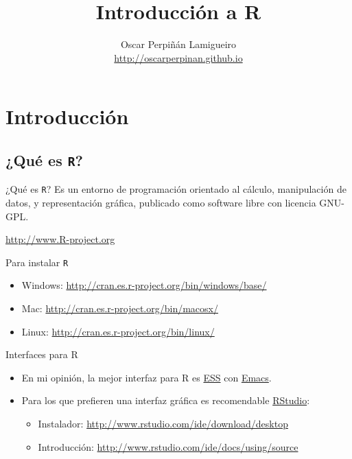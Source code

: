 \documentclass[xcolor={usenames,svgnames,dvipsnames}]{beamer}
\author{Oscar Perpiñán Lamigueiro \\ \url{http://oscarperpinan.github.io}}
\date{}
\title{Introducción a R}
\begin{document}
\maketitle

\section{Introducción}
\label{sec-1}
\subsection{¿Qué es \texttt{R}?}
\label{sec-1-1}
\begin{frame}[fragile,label=sec-1-1-1]{¿Qué es \texttt{R}?}
 Es un entorno de programación orientado al cálculo, manipulación de datos, y representación gráfica, publicado como software libre con licencia GNU-GPL.
\begin{center}
\url{http://www.R-project.org} 
\end{center}
\end{frame}

\begin{frame}[fragile,label=sec-1-1-2]{Para instalar \texttt{R}}
 \begin{itemize}
\item Windows: \url{http://cran.es.r-project.org/bin/windows/base/}
\item Mac: \url{http://cran.es.r-project.org/bin/macosx/}
\item Linux: \url{http://cran.es.r-project.org/bin/linux/}
\end{itemize}
\end{frame}

\begin{frame}[label=sec-1-1-3]{Interfaces para R}
\begin{itemize}
\item En mi opinión, la mejor interfaz para R es \href{http://ess.r-project.org/}{ESS} con \href{http://www.gnu.org/software/emacs/}{Emacs}.
\item Para los que prefieren una interfaz gráfica es recomendable \href{http://www.rstudio.com/ide/}{RStudio}:
\begin{itemize}
\item Instalador: \url{http://www.rstudio.com/ide/download/desktop}
\item Introducción: \url{http://www.rstudio.com/ide/docs/using/source}
\end{itemize}
\end{itemize}
\end{frame}
\end{document}
